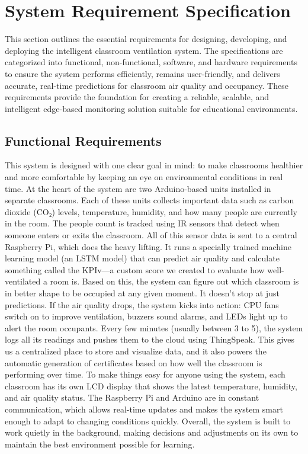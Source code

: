 \chapter{System Requirement Specification}

This section outlines the essential requirements for designing, developing, and deploying the intelligent classroom ventilation system. The specifications are categorized into functional, non-functional, software, and hardware requirements to ensure the system performs efficiently, remains user-friendly, and delivers accurate, real-time predictions for classroom air quality and occupancy. These requirements provide the foundation for creating a reliable, scalable, and intelligent edge-based monitoring solution suitable for educational environments.

\section{Functional Requirements}
This system is designed with one clear goal in mind: to make classrooms healthier and more comfortable by keeping an eye on environmental conditions in real time. At the heart of the system are two Arduino-based units installed in separate classrooms. Each of these units collects important data such as carbon dioxide (CO₂) levels, temperature, humidity, and how many people are currently in the room. The people count is tracked using IR sensors that detect when someone enters or exits the classroom. All of this sensor data is sent to a central Raspberry Pi, which does the heavy lifting. It runs a specially trained machine learning model (an LSTM model) that can predict air quality and calculate something called the KPIv—a custom score we created to evaluate how well-ventilated a room is. Based on this, the system can figure out which classroom is in better shape to be occupied at any given moment. It doesn't stop at just predictions. If the air quality drops, the system kicks into action: CPU fans switch on to improve ventilation, buzzers sound alarms, and LEDs light up to alert the room occupants. Every few minutes (usually between 3 to 5), the system logs all its readings and pushes them to the cloud using ThingSpeak. This gives us a centralized place to store and visualize data, and it also powers the automatic generation of certificates based on how well the classroom is performing over time. To make things easy for anyone using the system, each classroom has its own LCD display that shows the latest temperature, humidity, and air quality status. The Raspberry Pi and Arduino are in constant communication, which allows real-time updates and makes the system smart enough to adapt to changing conditions quickly. Overall, the system is built to work quietly in the background, making decisions and adjustments on its own to maintain the best environment possible for learning.
\\
